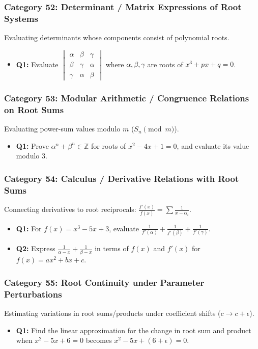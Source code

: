 \documentclass[10pt,a4paper]{article}
\begin{document}
\subsubsection{Category 52: Determinant / Matrix Expressions of Root Systems}
Evaluating determinants whose components consist of polynomial roots.
\begin{itemize}[leftmargin=*]
    \item \textbf{Q1:} Evaluate $\begin{vmatrix} \alpha & \beta & \gamma \\ \beta & \gamma & \alpha \\ \gamma & \alpha & \beta \end{vmatrix}$ where $\alpha, \beta, \gamma$ are roots of $x^3 + px + q = 0$.
\end{itemize}

\subsubsection{Category 53: Modular Arithmetic / Congruence Relations on Root Sums}
Evaluating power-sum values modulo $m$ ($S_n \pmod m$).
\begin{itemize}[leftmargin=*]
    \item \textbf{Q1:} Prove $\alpha^n + \beta^n \in \mathbb{Z}$ for roots of $x^2 - 4x + 1 = 0$, and evaluate its value modulo $3$.
\end{itemize}

\subsubsection{Category 54: Calculus / Derivative Relations with Root Sums}
Connecting derivatives to root reciprocals: $\frac{f'(x)}{f(x)} = \sum \frac{1}{x - \alpha_i}$.
\begin{itemize}[leftmargin=*]
    \item \textbf{Q1:} For $f(x) = x^3 - 5x + 3$, evaluate $\frac{1}{f'(\alpha)} + \frac{1}{f'(\beta)} + \frac{1}{f'(\gamma)}$.
    \item \textbf{Q2:} Express $\frac{1}{\alpha - x} + \frac{1}{\beta - x}$ in terms of $f(x)$ and $f'(x)$ for $f(x) = ax^2 + bx + c$.
\end{itemize}

\subsubsection{Category 55: Root Continuity under Parameter Perturbations}
Estimating variations in root sums/products under coefficient shifts ($c \to c + \epsilon$).
\begin{itemize}[leftmargin=*]
    \item \textbf{Q1:} Find the linear approximation for the change in root sum and product when $x^2 - 5x + 6 = 0$ becomes $x^2 - 5x + (6+\epsilon) = 0$.
\end{itemize}
\end{document}
